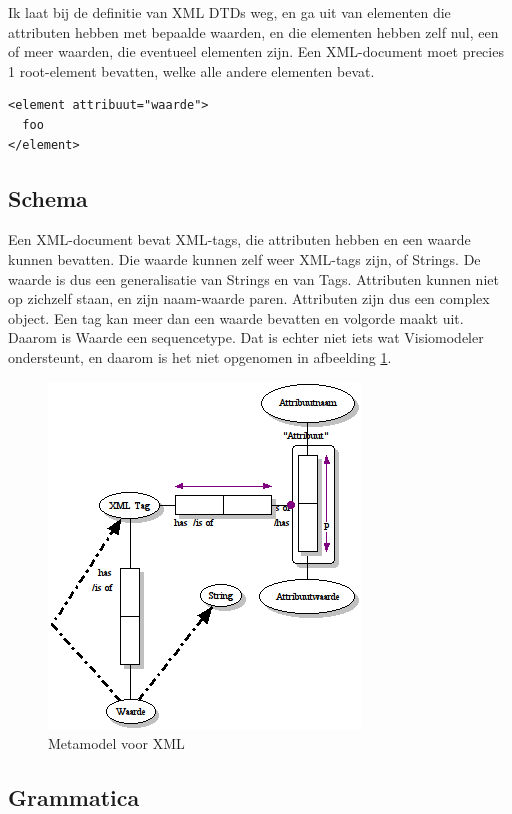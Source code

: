 \documentclass[11pt]{article}
\begin{document}
Ik laat bij de definitie van XML DTDs weg, en ga uit van elementen die
attributen hebben met bepaalde waarden, en die elementen hebben zelf nul, een
of meer waarden, die eventueel elementen zijn. Een XML-document moet precies
1 root-element bevatten, welke alle andere elementen bevat.

\begin{verbatim}
<element attribuut="waarde">
  foo
</element>
\end{verbatim} 

\subsection{Schema}

Een XML-document bevat XML-tags, die attributen hebben en een waarde kunnen 
bevatten. Die waarde kunnen zelf weer XML-tags zijn, of Strings. De waarde
is dus een generalisatie van Strings en van Tags. Attributen kunnen niet
op zichzelf staan, en zijn naam-waarde paren. Attributen zijn dus een complex
object. Een tag kan meer dan een waarde bevatten en volgorde maakt uit. Daarom
is Waarde een sequencetype. Dat is echter niet iets wat Visiomodeler ondersteunt,
en daarom is het niet opgenomen in afbeelding \ref{fig:xmlmodel}.

\begin{figure}[htpb]
  \centering
  \includegraphics[scale=0.8]{xml.png}
  \caption{Metamodel voor XML}
  \label{fig:xmlmodel}
\end{figure}

\subsection{Grammatica}
\end{document}

